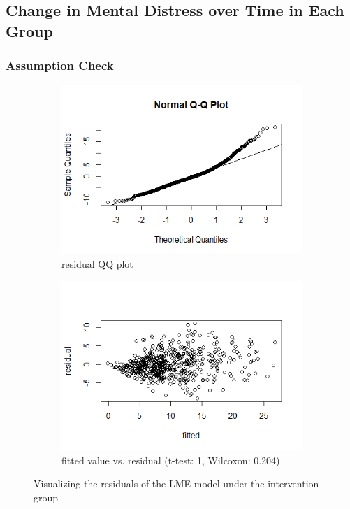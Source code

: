 \subsection{Change in Mental Distress over Time in Each Group}

\subsubsection{Assumption Check}

\begin{figure}[H]
\begin{subfigure}{.5\textwidth}
  \centering
  \includegraphics[width=1\linewidth]{../../plots/qq_residual_treatment.png}
  \caption{residual QQ plot}
\end{subfigure}
\begin{subfigure}{.5\textwidth}
  \centering
  \includegraphics[width=1\linewidth]{../../plots/residual_treatment.png}
  \caption{fitted value vs. residual (t-test: 1, Wilcoxon: 0.204)}
\end{subfigure}
\caption{Visualizing the residuals of the LME model under the intervention group}
\label{fig:residual.treatment}
\end{figure}

